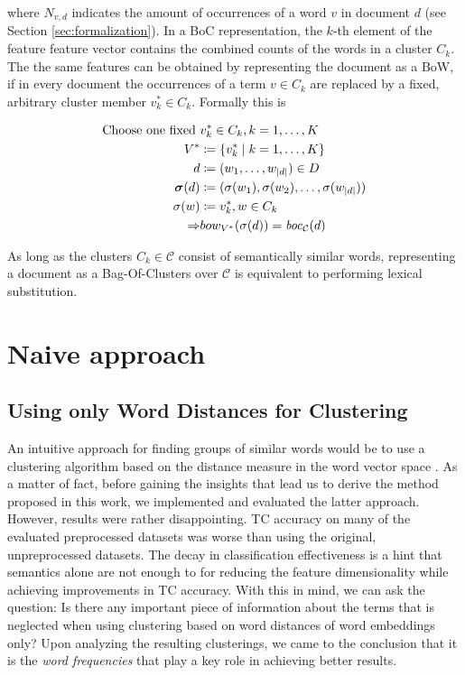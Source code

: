 where $N_{v,d}$ indicates the amount of occurrences of a word $v$ in
document $d$ (see Section \ref{sec:formalization}). In a BoC representation, the 
$k$-th element of the feature feature vector contains the combined counts of the words in a cluster $C_k$. 
The the same features can be obtained by representing the document as
a BoW, if in every document the occurrences of a term $v
\in C_k$ are replaced by a fixed, arbitrary cluster member $v_k^* \in C_k$.
Formally this is

\begin{equation*}
\begin{split}
	\text{Choose one fixed~}& v_k^* \in C_k, k=1,\ldots,K \\
	V^* &\coloneqq \{v_k^* \mid k=1,\ldots,K\} \\	
	d &\coloneqq (w_1,\ldots,w_{|d|}) \in D \\
	\boldsymbol\sigma(d) &\coloneqq (\sigma(w_1),
	\sigma(w_2),\ldots,\sigma(w_{|d|}))
	\\
	\sigma(w) &\coloneqq v_k^*, w \in C_k \\ 
	\Rightarrow & bow_{V^*}(\sigma(d)) = \mathit{boc}_\mathcal{C}(d)
\end{split}
\end{equation*}

As long as the clusters $C_k \in \mathcal{C}$ consist of semantically similar
words, representing a document as a Bag-Of-Clusters over $\mathcal{C}$ is
equivalent to performing lexical substitution.

\section{Naive approach}
\label{sec:naive-approach}

\subsection{Using only Word Distances for Clustering}
An intuitive approach for finding groups of similar words would be to use a
clustering algorithm based on the distance measure in the word vector
space \cite{ma2015using}. As a matter of fact, before gaining the insights that
lead us to derive the method proposed in this work, we implemented and evaluated 
the latter approach.
However, results were rather disappointing. TC accuracy on many
of the evaluated preprocessed datasets was worse than using the original,
unpreprocessed datasets. The decay in classification 
effectiveness is a hint that semantics alone are not enough to for reducing the
feature dimensionality while achieving improvements in TC
accuracy. With this in mind, we can ask the question: Is there any important
piece of information about the terms that is neglected when using clustering
based on word distances of word embeddings only? Upon analyzing the resulting
clusterings, we came to the conclusion that it is the \emph{word frequencies}
that play a key role in achieving better results. 

